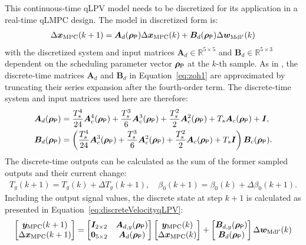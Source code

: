 This continuous-time qLPV model needs to be discretized for its application in a real-time qLMPC design. The model in discretized form is:
\begin{align}\label{eq4:DiscreteForm}
    \Delta \bm{x}_{\text{MPC}}(k+1) = \bm{A}_{d}(\bm{\rho}_{\mathsf{P}})\Delta \bm{x}_{\text{MPC}}(k) + \bm{B}_{d}(\bm{\rho}_{\mathsf{P}}) \Delta \bm{w}_{\text{Mdl}^\prime}(k)
\end{align}
with the discretized system and input matrices $\bm{A}_d \in \mathbb{R}^{5 \times 5}$ and $\bm{B}_d \in \mathbb{R}^{5 \times 3}$ dependent on the scheduling parameter vector $\bm{\rho}_{\mathsf{P}}$ at the $k$-th sample.
%
%
As in \cite{cisneros2019wide}, the discrete-time matrices $\bm{A}_d$ and $\bm{B}_d$ in Equation~\eqref{eq:zoh1} are approximated by truncating their series expansion after the fourth-order term. The discrete-time system and input matrices used here are therefore:
\begin{align*}
    \bm{A}_{d}(\bm{\rho}_{\mathsf{P}}) &= \frac{T_s^4}{24}\bm{A}_c^4(\bm{\rho}_{\mathsf{P}}) + \frac{T_s^3}{6}\bm{A}_c^3(\bm{\rho}_{\mathsf{P}}) + \frac{T_s^2}{2}\bm{A}_c^2(\bm{\rho}_{\mathsf{P}}) + T_s \bm{A}_c(\bm{\rho}_{\mathsf{P}}) + \bm{I},\\
    \bm{B}_{d}(\bm{\rho}_{\mathsf{P}}) &= \left( \frac{T_s^4}{24}\bm{A}_c^3(\bm{\rho}_{\mathsf{P}}) + \frac{T_s^3}{6}\bm{A}_c^2(\bm{\rho}_{\mathsf{P}}) + \frac{T_s^2}{2}\bm{A}_c(\bm{\rho}_{\mathsf{P}}) + T_s \bm{I} \right) \bm{B}_c(\bm{\rho}_{\mathsf{P}}).
\end{align*}
%
The discrete-time outputs can be calculated as the sum of the former sampled outputs and their current change:
\begin{align*}
    T_{g}(k+1) = T_{g}(k) + \Delta T_{g}(k+1), \quad \beta_{0}(k+1) = \beta_{0}(k) + \Delta \beta_{0}(k+1).
\end{align*}
%
Including the output signal values, the discrete state at step $k+1$ is calculated as presented in Equation~\eqref{eq:discreteVelocityqLPV}:
\begin{equation} \label{eq:discreteVelocityqLPV4}
    \begin{bmatrix}
        \bm{y}_{\text{MPC}}(k+1) \\
        \Delta \bm{x}_{\text{MPC}}(k+1)
    \end{bmatrix} = \begin{bmatrix}
        \bm{I}_{2\times2} & \bm{A}_{d,y}(\bm{\rho}_{\mathsf{P}}) \\
        \bm{0}_{5\times2} & \bm{A}_{d}(\bm{\rho}_{\mathsf{P}})
    \end{bmatrix} \begin{bmatrix}
        \bm{y}_{\text{MPC}}(k) \\
        \Delta \bm{x}_{\text{MPC}}(k)
    \end{bmatrix} + \begin{bmatrix}
        \bm{B}_{d,y}(\bm{\rho}_{\mathsf{P}}) \\
        \bm{B}_{d}(\bm{\rho}_{\mathsf{P}})
    \end{bmatrix} \Delta \bm{w}_{\text{Mdl}^\prime}(k)
\end{equation}
